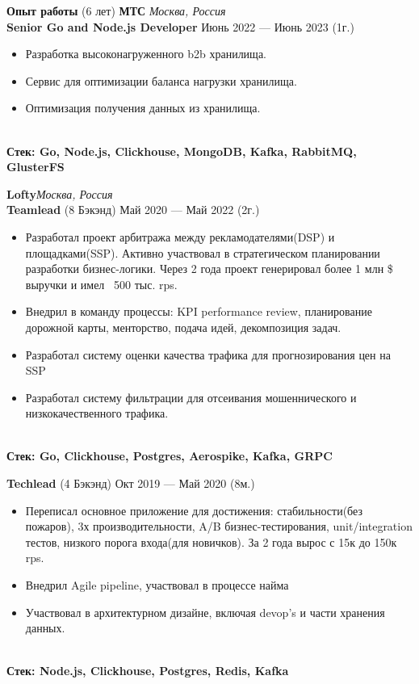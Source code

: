 \documentclass{resume}
\begin{document}
\begin{rSection}{\textbf{Опыт работы} (6 лет) }
    \textbf{МТС} \hfill \textit{Москва, Россия} \\
    \textbf{Senior Go and Node.js Developer}  \hfill Июнь 2022 --- Июнь 2023 (1г.)
    \begin{itemize}
        \setlength\itemsep{-0.4em}
        \item Разработка высоконагруженного b2b хранилища.
        \item Сервис для оптимизации баланса нагрузки хранилища.
        \item Оптимизация получения данных из хранилища.
    \end{itemize}
    \\\textbf{Стек: Go, Node.js, Clickhouse, MongoDB, Kafka, RabbitMQ, GlusterFS}

    \textbf{Lofty}\hfill \textit{Москва, Россия} \\
    \textbf{Teamlead} (8 Бэкэнд) \hfill Май 2020 --- Май 2022 (2г.)
    \begin{itemize}
        \setlength\itemsep{-0.4em}
        \item Разработал проект арбитража между рекламодателями(DSP) и площадками(SSP). Активно участвовал в стратегическом
        планировании разработки бизнес-логики.
        Через 2 года проект генерировал более 1 млн \$ выручки и имел ~500 тыс.
        rps.
        \item Внедрил в команду процессы: KPI performance review, планирование дорожной карты, менторство, подача идей, декомпозиция задач.
        \item Разработал систему оценки качества трафика для прогнозирования цен на SSP
        \item Разработал систему фильтрации для отсеивания мошеннического и низкокачественного трафика.
    \end{itemize}
    \\\textbf{Стек: Go, Clickhouse, Postgres, Aerospike, Kafka, GRPC}

    \textbf{Techlead} (4 Бэкэнд) \hfill Окт 2019 --- Май 2020 (8м.)
    \begin{itemize}
        \setlength\itemsep{-0.4em}
        \item Переписал основное приложение для достижения: стабильности(без пожаров), 3х производительности, A/B бизнес-тестирования, unit/integration тестов, низкого порога входа(для новичков).
        За 2 года вырос с 15к до 150к rps.
        \item Внедрил Agile pipeline, участвовал в процессе найма
        \item Участвовал в архитектурном дизайне, включая devop's и части хранения данных.
    \end{itemize}
    \\\textbf{Стек: Node.js, Clickhouse, Postgres, Redis, Kafka}


\end{rSection}
\end{document}
